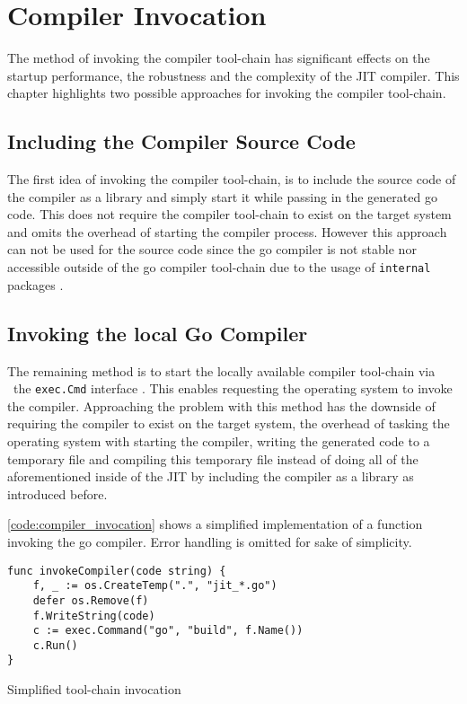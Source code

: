 \chapter{Compiler Invocation}

The method of invoking the compiler tool-chain has significant effects on the
startup performance, the robustness and the complexity of the JIT compiler.
This chapter highlights two possible approaches for invoking the compiler
tool-chain. 

\section{Including the Compiler Source Code}

The first idea of invoking the compiler tool-chain, is to include the source
code of the compiler as a library and simply start it while passing in the
generated go code. This does not require the compiler tool-chain to exist on
the target system and omits the overhead of starting the compiler process.
However this approach can not be used for the source code since the go compiler
is not stable nor accessible outside of the go compiler tool-chain
\cite[\textit{(gcToolchain).gc}]{gc_source} due to the usage of
\texttt{internal} packages \cite{go_internal_dir}.

\section{Invoking the local Go Compiler}

The remaining method is to start the locally available compiler tool-chain via
\ the \texttt{exec.Cmd} interface \cite[Overview]{go_os_exec}. This enables
requesting the operating system to invoke the compiler. Approaching the problem
with this method has the downside of requiring the compiler to exist on the
target system, the overhead of tasking the operating system with starting the
compiler, writing the generated code to a temporary file and compiling this
temporary file instead of doing all of the aforementioned inside of the JIT by
including the compiler as a library as introduced before.

\autoref{code:compiler_invocation} shows a simplified implementation of a
function invoking the go compiler. Error handling is omitted for sake of
simplicity.

\begin{listing}[H]
    \begin{verbatim}
func invokeCompiler(code string) {
    f, _ := os.CreateTemp(".", "jit_*.go")
    defer os.Remove(f)
    f.WriteString(code)
    c := exec.Command("go", "build", f.Name())
    c.Run()
}
    \end{verbatim}
    \caption{Simplified tool-chain invocation}
    \label{code:compiler_invocation}
\end{listing}

